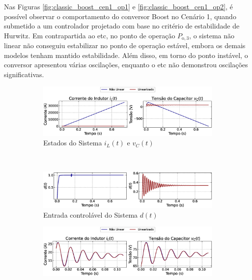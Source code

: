 Nas Figuras \ref{fig:classic_boost_cen1_op1} e \ref{fig:classic_boost_cen1_op2}, é possível observar o comportamento do conversor Boost no Cenário 1, quando submetido a um controlador projetado com base no critério de estabilidade de Hurwitz. Em contrapartida ao \acrshort{etc}, no ponto de operação $P_{\mathrm{o}, 3}$, o sistema não linear não conseguiu estabilizar no ponto de operação estável, embora os demais modelos tenham mantido estabilidade. Além disso, em torno do ponto instável, o conversor apresentou várias oscilações, enquanto o \acrshort{etc} não demonstrou oscilações significativas.

\begin{figure}[H]
  \centering
  \captionsetup{justification=centering}
  \begin{subfigure}{1.\textwidth}
    \centering
    \includegraphics[width=1.\textwidth]{figuras/classic/boost/sim1/op1/result.eps}
    \caption{Estados do Sistema $i_L(t)$  e $v_C(t)$}
  \end{subfigure}
  \\[6pt]
  \begin{subfigure}{1.\textwidth}
    \centering
    \includegraphics[width=1.\textwidth]{figuras/classic/boost/sim1/op1/duty-cycle.eps}
    \caption{Entrada controlável do Sistema $d(t)$}
  \end{subfigure}
  \caption{Conversor Boost no Cenário 1 operando em torno de $P_{\mathrm{o}, 3}$ sob controlador projetado utilizando o critério de estabilidade de Hurwitz.}
  \label{fig:classic_boost_cen1_op1}
  \begin{subfigure}{1.\textwidth}
    \centering
    \includegraphics[width=1.\textwidth]{figuras/classic/boost/sim1/op2/result.eps}

\end{subfigure}
\end{figure}
